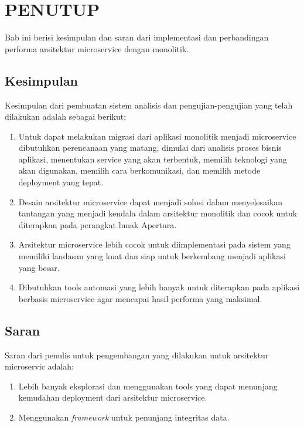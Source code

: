 \chapter{PENUTUP}

%
\vspace{4.5pt}
Bab ini berisi kesimpulan dan saran dari implementasi dan perbandingan performa arsitektur microservice dengan monolitik.
\section{Kesimpulan}
Kesimpulan dari pembuatan sistem analisis dan 
pengujian-pengujian yang telah dilakukan adalah sebagai berikut:
\begin{enumerate}
	\item Untuk dapat melakukan migrasi dari aplikasi monolitik menjadi microservice dibutuhkan perencanaan yang matang, dimulai dari analisis proses bisnis aplikasi, menentukan service yang akan terbentuk, memilih teknologi yang akan digunakan, memilih cara berkomunikasi, dan memilih metode deployment yang tepat.
	\item Desain arsitektur microservice dapat menjadi solusi dalam menyelesaikan tantangan yang menjadi kendala dalam arsitektur monolitik dan cocok untuk diterapkan pada perangkat lunak Apertura.
	\item Arsitektur microservice lebih cocok untuk diimplementasi  pada sistem yang memiliki landasan yang kuat dan siap untuk berkembang menjadi aplikasi yang besar.
	\item Dibutuhkan tools automasi yang lebih banyak untuk diterapkan pada aplikasi berbasis microservice agar mencapai hasil performa yang maksimal.
\end{enumerate}
\section{Saran}
Saran dari penulis untuk pengembangan yang dilakukan untuk arsitektur microservic adalah:
\begin{enumerate}
	\item Lebih banyak eksplorasi dan menggunakan tools yang dapat menunjang kemudahan deployment dari arsitektur microservice.
	\item Menggunakan \textit{framework} untuk penunjang integritas data.
\end{enumerate}
\newpage